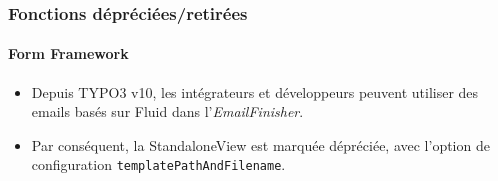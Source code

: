 %

\begin{frame}[fragile]
	\frametitle{Fonctions dépréciées/retirées}
	\framesubtitle{Form Framework}

	\begin{itemize}
		\item Depuis TYPO3 v10, les intégrateurs et développeurs peuvent utiliser des emails basés sur
			Fluid dans l'\textit{EmailFinisher}.
		\item Par conséquent, la StandaloneView est marquée dépréciée,
			avec l'option de configuration \texttt{templatePathAndFilename}.
	\end{itemize}

\end{frame}

